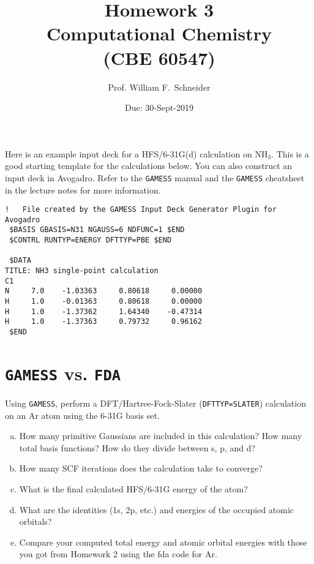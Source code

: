 \documentclass[11pt]{article}
\date{Due: 30-Sept-2019}
\title{}
\begin{document}
\title{Homework 3\\Computational Chemistry\\(CBE 60547)}
\author{Prof. William F.\ Schneider}
\maketitle

Here is an example input deck for a HFS/6-31G(d) calculation on NH\(_{\text{3}}\). This is a good starting template for the calculations below. You can also construct an input deck in Avogadro. Refer to the \texttt{GAMESS} manual and the \texttt{GAMESS} cheatsheet in the lecture notes for more information.

\begin{verbatim}
!   File created by the GAMESS Input Deck Generator Plugin for Avogadro
 $BASIS GBASIS=N31 NGAUSS=6 NDFUNC=1 $END
 $CONTRL RUNTYP=ENERGY DFTTYP=PBE $END

 $DATA 
TITLE: NH3 single-point calculation
C1
N     7.0    -1.03363     0.80618     0.00000
H     1.0    -0.01363     0.80618     0.00000
H     1.0    -1.37362     1.64340    -0.47314
H     1.0    -1.37363     0.79732     0.96162
 $END
\end{verbatim}


\section{\texttt{GAMESS} vs. \texttt{FDA}}
\label{sec:org36b0df6}
Using \texttt{GAMESS}, perform a DFT/Hartree-Fock-Slater (\texttt{DFTTYP=SLATER}) calculation on an Ar atom using the 6-31G basis set.

\begin{enumerate}[(a)]
\item How many primitive Gaussians are included in this calculation? How many total basis functions? How do they divide between s, p, and d?

\item How many SCF iterations does the calculation take to converge?

\item What is the final calculated HFS/6-31G energy of the atom?

\item What are the identities (1s, 2p, etc.) and energies of the occupied atomic orbitals?

\item Compare your computed total energy and atomic orbital energies with those you got from Homework 2 using the fda code for Ar.
\end{enumerate}
\end{document}
